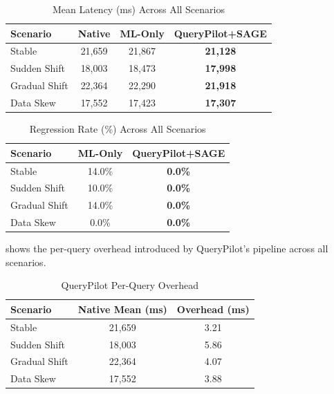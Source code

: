 \begin{table}[htbp]
  \centering
  \caption{Mean Latency (ms) Across All Scenarios}
  \label{tab:all_latency}
  \renewcommand{\arraystretch}{1.3}
  \begin{tabular}{|l|c|c|c|}
    \hline
    \textbf{Scenario} & \textbf{Native} & \textbf{ML-Only} & \textbf{QueryPilot+SAGE} \\
    \hline
    Stable        & 21,659 & 21,867 & \textbf{21,128} \\
    Sudden Shift  & 18,003 & 18,473 & \textbf{17,998} \\
    Gradual Shift & 22,364 & 22,290 & \textbf{21,918} \\
    Data Skew     & 17,552 & 17,423 & \textbf{17,307} \\
    \hline
  \end{tabular}
\end{table}

\begin{table}[htbp]
  \centering
  \caption{Regression Rate (\%) Across All Scenarios}
  \label{tab:all_regression}
  \renewcommand{\arraystretch}{1.3}
  \begin{tabular}{|l|c|c|}
    \hline
    \textbf{Scenario} & \textbf{ML-Only} & \textbf{QueryPilot+SAGE} \\
    \hline
    Stable        & 14.0\% & \textbf{0.0\%} \\
    Sudden Shift  & 10.0\% & \textbf{0.0\%} \\
    Gradual Shift & 14.0\% & \textbf{0.0\%} \\
    Data Skew     &  0.0\% & \textbf{0.0\%} \\
    \hline
  \end{tabular}
\end{table}

 shows the per-query overhead introduced by QueryPilot's
pipeline across all scenarios.

\begin{table}[htbp]
  \centering
  \caption{QueryPilot Per-Query Overhead}
  \label{tab:overhead}
  \renewcommand{\arraystretch}{1.3}
  \begin{tabular}{|l|c|c|}
    \hline
    \textbf{Scenario} & \textbf{Native Mean (ms)} & \textbf{Overhead (ms)} \\
    \hline
    Stable        & 21,659 & 3.21 \\
    Sudden Shift  & 18,003 & 5.86 \\
    Gradual Shift & 22,364 & 4.07 \\
    Data Skew     & 17,552 & 3.88 \\
    \hline
  \end{tabular}
\end{table}

